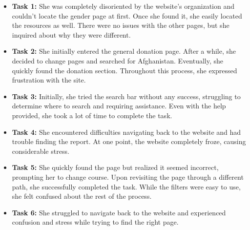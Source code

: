 \begin{itemize}
    \item \textbf{Task 1:} She was completely disoriented by the website's organization and couldn't locate the gender page at first. Once she found it, she easily located the resources as well. There were no issues with the other pages, but she inquired about why they were different.
    \item \textbf{Task 2:} She initially entered the general donation page. After a while, she decided to change pages and searched for Afghanistan. Eventually, she quickly found the donation section. Throughout this process, she expressed frustration with the site.
    \item \textbf{Task 3:} Initially, she tried the search bar without any success, struggling to determine where to search and requiring assistance. Even with the help provided, she took a lot of time to complete the task.
    \item \textbf{Task 4:} She encountered difficulties navigating back to the website and had trouble finding the report. At one point, the website completely froze, causing considerable stress.
    \item \textbf{Task 5:} She quickly found the page but realized it seemed incorrect, prompting her to change course. Upon revisiting the page through a different path, she successfully completed the task. While the filters were easy to use, she felt confused about the rest of the process.
    \item \textbf{Task 6:} She struggled to navigate back to the website and experienced confusion and stress while trying to find the right page.
\end{itemize}




\vspace{1cm}

